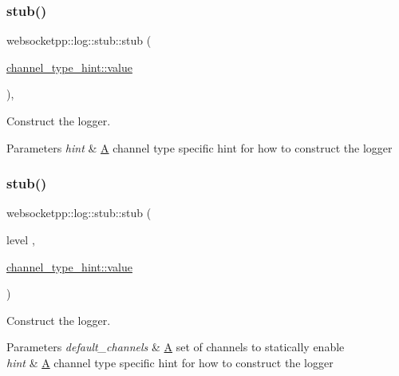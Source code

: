 \subsubsection{\texorpdfstring{stub()}{stub()}\hspace{0.1cm}{\footnotesize\ttfamily [1/2]}}
{\footnotesize\ttfamily websocketpp\+::log\+::stub\+::stub (\begin{DoxyParamCaption}\item[{\mbox{\hyperlink{structwebsocketpp_1_1log_1_1channel__type__hint_ad12a7f6555b71aabdc4cbec604dc89dd}{channel\+\_\+type\+\_\+hint\+::value}}}]{ }\end{DoxyParamCaption})\hspace{0.3cm}{\ttfamily [inline]}, {\ttfamily [explicit]}}



Construct the logger. 


\begin{DoxyParams}{Parameters}
{\em hint} & \mbox{\hyperlink{struct_a}{A}} channel type specific hint for how to construct the logger \\
\hline
\end{DoxyParams}
\mbox{\label{classwebsocketpp_1_1log_1_1stub_a45e96ad7f1a562c446645961d8d24784}} 
\subsubsection{\texorpdfstring{stub()}{stub()}\hspace{0.1cm}{\footnotesize\ttfamily [2/2]}}
{\footnotesize\ttfamily websocketpp\+::log\+::stub\+::stub (\begin{DoxyParamCaption}\item[{level}]{,  }\item[{\mbox{\hyperlink{structwebsocketpp_1_1log_1_1channel__type__hint_ad12a7f6555b71aabdc4cbec604dc89dd}{channel\+\_\+type\+\_\+hint\+::value}}}]{ }\end{DoxyParamCaption})\hspace{0.3cm}{\ttfamily [inline]}}



Construct the logger. 


\begin{DoxyParams}{Parameters}
{\em default\+\_\+channels} & \mbox{\hyperlink{struct_a}{A}} set of channels to statically enable \\
\hline
{\em hint} & \mbox{\hyperlink{struct_a}{A}} channel type specific hint for how to construct the logger \\
\hline
\end{DoxyParams}


